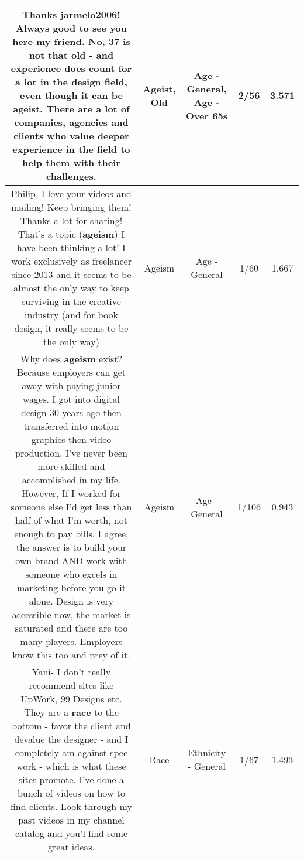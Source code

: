 \documentclass[11pt]{article}
\newlength\mylength
\begin{document}
\begin{center}
\begin{longtable}{|C{.65\mylength}|C{.30\mylength}|C{.12\mylength}|C{.12\mylength}|C{.12\mylength}|}
  \small Thanks jarmelo2006! Always good to see you here my friend. No, 37 is not that \textbf{old} - and experience does count for a lot in the design field, even though it can be \textbf{ageist}. There are a lot of companies, agencies and clients who value deeper experience in the field to help them with their challenges.\normalsize   & Ageist, Old & Age - General, Age - Over 65s & 2/56 & 3.571 \\  \hline
  \small Philip, I love your videos and mailing! Keep bringing them! Thanks a lot for sharing! That's a topic (\textbf{ageism}) I have been thinking a lot! I work exclusively as freelancer since 2013 and it seems to be almost the only way to keep surviving in the creative industry (and for book design, it really seems to be the only way)\normalsize   & Ageism & Age - General & 1/60 & 1.667 \\  \hline
  \small Why does \textbf{ageism} exist? Because employers can get away with paying junior wages. I got into digital design 30 years ago then transferred into motion graphics then video production. I've never been more skilled and accomplished in my life. However, If I worked for someone else I'd get less than half of what I'm worth, not enough to pay bills. I agree, the answer is to build your own brand AND work with someone who excels in marketing before you go it alone. Design is very accessible now, the market is saturated and there are too many players. Employers know this too and prey of it.\normalsize   & Ageism & Age - General & 1/106 & 0.943 \\  \hline
  \small Yani- I don't really recommend sites like UpWork, 99 Designs etc. They are a \textbf{race} to the bottom - favor the client and devalue the designer - and I completely am against spec work - which is what these sites promote. I've done a bunch of videos on how to find clients. Look through my past videos in my channel catalog and you'l find some great ideas.\normalsize   & Race & Ethnicity - General & 1/67 & 1.493 \\  \hline

\end{longtable}
\end{center}
\end{document}
